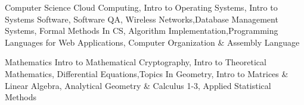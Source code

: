 
\vspace{0mm}
\begin{cvskills}

  \vspace{1mm}

  \cvskill
    {Computer Science} %
    {Cloud Computing, Intro to Operating Systems, Intro to Systems Software, Software QA, Wireless Networks,\newline Database Management Systems, Formal Methods In CS, Algorithm Implementation,\newline Programming Languages for Web Applications, Computer Organization \& Assembly Language} %

   \cvskill
    {Mathematics} %
	{Intro to Mathematical Cryptography, Intro to Theoretical Mathematics, Differential Equations,\newline Topics In Geometry, Intro to Matrices \& Linear Algebra, Analytical Geometry \& Calculus 1-3, Applied Statistical Methods} %


\end{cvskills}